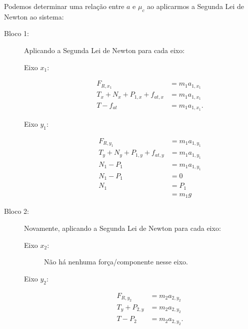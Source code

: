 Podemos determinar uma relação entre $a$ e $\mu_c$ ao aplicarmos a Segunda Lei de Newton ao sistema:
\begin{description}
    \item[Bloco 1:] Aplicando a Segunda Lei de Newton para cada eixo:
        \begin{description}
            \item[Eixo $x_1$:]
                \begin{align}
                    F_{R, x_1} &= m_1 a_{1,x_1} \\
                    T_x + N_x + P_{1,x} + f_{at,x} &= m_1 a_{1,x_1} \\
                    T - f_{at} &= m_1 a_{1,x_1}. \label{Eq:AtwoodHorizX1}
                \end{align}
            \item[Eixo $y_1$:]
                \begin{align}
                    F_{R, y_1} &= m_1 a_{1,y_1} \\
                    T_y + N_y + P_{1,y} + f_{at,y} &= m_1 a_{1,y_1} \\
                    N_1 - P_1 &= m_1 a_{1,y_1} \\
                    N_1 - P_1 &= 0 \\
                    N_1 &= P_1 \\
                    &= m_1 g
                \end{align}
        \end{description}
    \item[Bloco 2:] Novamente, aplicando a Segunda Lei de Newton para cada eixo:
        \begin{description}
            \item[Eixo $x_2$:] Não há nenhuma força/componente nesse eixo.
            \item[Eixo $y_2$:]
                \begin{align}
                    F_{R, y_2} &= m_2 a_{2,y_2} \\
                    T_y + P_{2,y} &= m_2 a_{2,y_2} \\
                    T - P_2 &= m_2 a_{2,y_2}. \label{Eq:AtwoodHorizY2}
                \end{align}
        \end{description}
\end{description}

